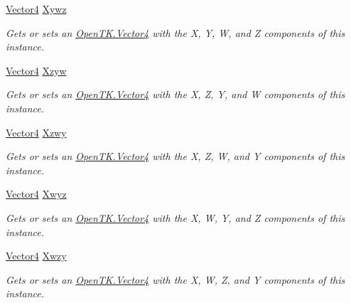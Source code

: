 \begin{DoxyCompactItemize}
\hyperlink{struct_open_t_k_1_1_vector4}{Vector4} \hyperlink{struct_open_t_k_1_1_vector4_ac6b6b6787cb704e6efe742dc48ad7544}{Xywz}
\begin{DoxyCompactList}\small\item\em Gets or sets an \hyperlink{struct_open_t_k_1_1_vector4}{Open\-T\-K.\-Vector4} with the X, Y, W, and Z components of this instance. \end{DoxyCompactList}\item 
\hyperlink{struct_open_t_k_1_1_vector4}{Vector4} \hyperlink{struct_open_t_k_1_1_vector4_a9d766347910a9c70e72320a6b89a43c8}{Xzyw}
\begin{DoxyCompactList}\small\item\em Gets or sets an \hyperlink{struct_open_t_k_1_1_vector4}{Open\-T\-K.\-Vector4} with the X, Z, Y, and W components of this instance. \end{DoxyCompactList}\item 
\hyperlink{struct_open_t_k_1_1_vector4}{Vector4} \hyperlink{struct_open_t_k_1_1_vector4_a9562c726042c83a05978d9d4dceb6a71}{Xzwy}
\begin{DoxyCompactList}\small\item\em Gets or sets an \hyperlink{struct_open_t_k_1_1_vector4}{Open\-T\-K.\-Vector4} with the X, Z, W, and Y components of this instance. \end{DoxyCompactList}\item 
\hyperlink{struct_open_t_k_1_1_vector4}{Vector4} \hyperlink{struct_open_t_k_1_1_vector4_a757c3ecc2f21a65847b654624afa64e2}{Xwyz}
\begin{DoxyCompactList}\small\item\em Gets or sets an \hyperlink{struct_open_t_k_1_1_vector4}{Open\-T\-K.\-Vector4} with the X, W, Y, and Z components of this instance. \end{DoxyCompactList}\item 
\hyperlink{struct_open_t_k_1_1_vector4}{Vector4} \hyperlink{struct_open_t_k_1_1_vector4_a09321872882188fd71a114c1f5230024}{Xwzy}
\begin{DoxyCompactList}\small\item\em Gets or sets an \hyperlink{struct_open_t_k_1_1_vector4}{Open\-T\-K.\-Vector4} with the X, W, Z, and Y components of this instance. \end{DoxyCompactList}\item 

\end{DoxyCompactItemize}

